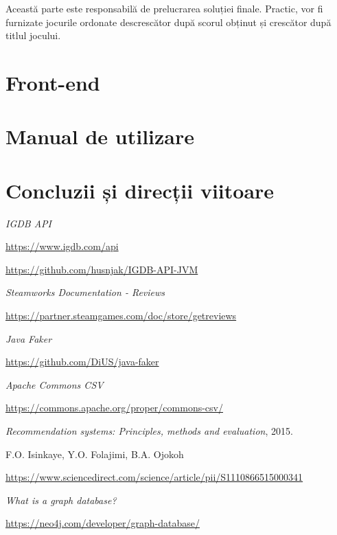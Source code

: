 \documentclass[12pt,a4paper]{report}
\begin{document}
Această parte este responsabilă de prelucrarea soluției finale. Practic, vor fi furnizate jocurile ordonate descrescător după scorul obținut și crescător după titlul jocului.

\section{Front-end}
\section{Manual de utilizare}
\section{Concluzii și direcții viitoare}

\renewcommand\bibname{Bibliografie}
\begin{thebibliography}{9}

  
  \textit{IGDB API}
  
  \url{https://www.igdb.com/api}
  
  \url{https://github.com/husnjak/IGDB-API-JVM}
  
  
  \textit{Steamworks Documentation - Reviews}
  
  \url{https://partner.steamgames.com/doc/store/getreviews}
  
  
  \textit{Java Faker}
  
  \url{https://github.com/DiUS/java-faker}
  
  
  \textit{Apache Commons CSV}
  
  \url{https://commons.apache.org/proper/commons-csv/}


  
  \textit{Recommendation systems: Principles, methods and evaluation},
  2015.
  
  F.O. Isinkaye, Y.O. Folajimi, B.A. Ojokoh
  
  \url{https://www.sciencedirect.com/science/article/pii/S1110866515000341}
  
  
  \textit{What is a graph database?}
  
  \url{https://neo4j.com/developer/graph-database/}
  

\end{thebibliography}
\end{document}
